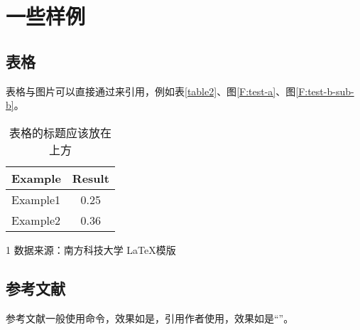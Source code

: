 
\section{一些样例}

\subsection{表格}

表格与图片可以直接通过\verbbox{\ref{<key>}}来引用，例如表\ref{table2}、图\ref{F:test-a}、图\ref{F:test-b-sub-b}。

\begin{table}[htb]
    \centering
    \caption{表格的标题应该放在上方}
    \label{table}
    \begin{tabular}{lc} %
        \toprule
        Example & Result \\
        \midrule
        Example1          & 0.25 \\
        Example2          & 0.36 \\
        \bottomrule
    \end{tabular}
\end{table}

\begin{table}[htb]
    \centering
    \caption{带表注的表格的标题}
    \label{table2}
    \begin{threeparttable}
        \begin{tablenotes}
            \item[1] 数据来源：南方科技大学 \LaTeX 模版 %
        \end{tablenotes}
    \end{threeparttable}
\end{table}

\subsection{参考文献}

参考文献一般使用命令，效果如是\cite{Nicholas1998Handbook}，引用作者使用，效果如是“\citeauthor{goossens1994latex}”。

